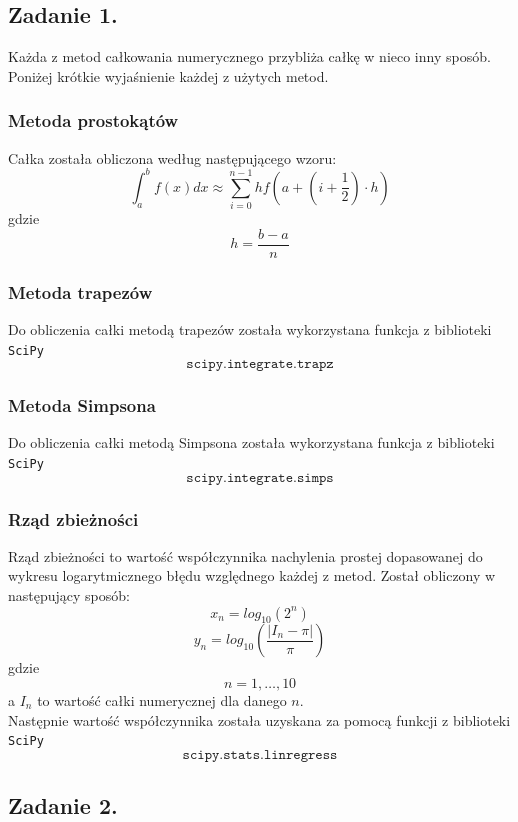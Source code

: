 \documentclass[11pt]{scrartcl}
\begin{document}
    \subsection{Zadanie 1.}
    Każda z metod całkowania numerycznego przybliża całkę w nieco
    inny sposób. Poniżej krótkie wyjaśnienie każdej z użytych
    metod.
    \subsubsection{Metoda prostokątów}
    Całka została obliczona według następującego wzoru:
    \[
        \int_{a}^{b}f(x)dx \approx \sum_{i=0}^{n-1}hf
        \left( a+ \left( i+\frac{1}{2} \right) \cdot h \right)
    \]
    gdzie
    \[
        h=\frac{b-a}{n}
    \]

    \subsubsection{Metoda trapezów}
    Do obliczenia całki metodą trapezów została wykorzystana funkcja
    z biblioteki \texttt{SciPy}
    \[
        \texttt{scipy.integrate.trapz}
    \]
    \subsubsection{Metoda Simpsona}
    Do obliczenia całki metodą Simpsona została wykorzystana funkcja
    z biblioteki \texttt{SciPy}
    \[
        \texttt{scipy.integrate.simps}
    \]

    \subsubsection{Rząd zbieżności}
    Rząd zbieżności to wartość współczynnika nachylenia prostej
    dopasowanej do wykresu logarytmicznego błędu względnego
    każdej z metod. Został obliczony w następujący sposób:
    \[
        x_n=log_{10}(2^n)
    \]
    \[
        y_n=log_{10}\left( \frac{|I_n-\pi|}{\pi} \right)
    \]
    gdzie
    \[
        n=1,\ldots,10
    \]
    a $I_n$ to wartość całki numerycznej dla danego $n$. \\
    Następnie wartość współczynnika została uzyskana za pomocą
    funkcji z biblioteki \texttt{SciPy}
    \[
        \texttt{scipy.stats.linregress}
    \]

    \subsection{Zadanie 2.}
\end{document}

